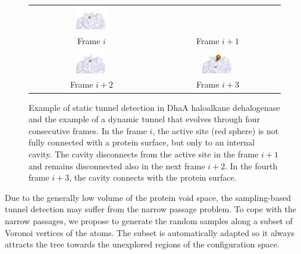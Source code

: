 \documentclass[usletter, 10pt, conference]{svjour3}      %
\begin{document}
\begin{figure}[t]
{\begin{tabular}{cc}
\includegraphics[width=0.26\textwidth]{fig/dt-f6} \\
Frame $i$ & Frame $i+1$ \\
\includegraphics[width=0.26\textwidth]{fig/dt-f7} &
\includegraphics[width=0.26\textwidth]{fig/dt-f8} \\
Frame $i+2$ & Frame $i+3$ \\
\end{tabular}
}
\caption{\label{fig::motiv}
Example of static tunnel detection in DhaA haloalkane dehalogenase and the example of a dynamic tunnel that evolves through four consecutive frames.
In the frame $i$, the active site (red sphere) is not fully connected with a protein surface, but only to an internal cavity.
The cavity disconnects from the active site in the frame $i+1$ and remains disconnected also in the next frame $i+2$.
In the fourth frame $i+3$, the cavity connects with the protein surface.
}
\end{figure}

Due to the generally low volume of the protein void space, the sampling-based tunnel detection may suffer from the narrow passage problem.
To cope with the narrow passages, we propose to generate the random samples along a subset of Voronoi vertices of the atoms.
The subset is automatically adapted so it always attracts the tree towards the unexplored regions of the configuration space.

\end{document}

